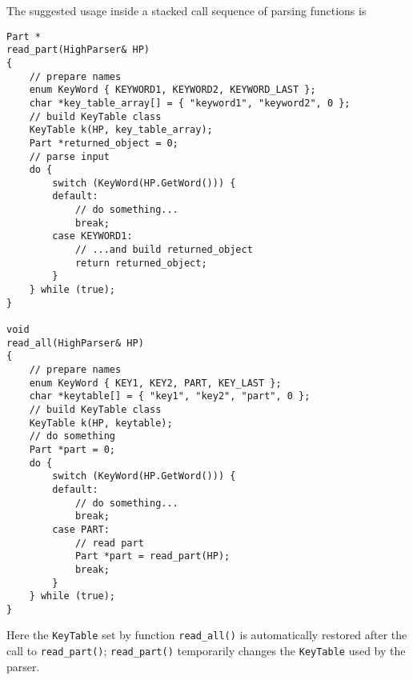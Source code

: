 \documentclass[10pt,dvips,fleqn,subeqn]{report}
\begin{document}
The suggested usage inside a stacked call sequence of parsing functions is
\begin{verbatim}
Part *
read_part(HighParser& HP)
{
    // prepare names
    enum KeyWord { KEYWORD1, KEYWORD2, KEYWORD_LAST };
    char *key_table_array[] = { "keyword1", "keyword2", 0 };
    // build KeyTable class
    KeyTable k(HP, key_table_array);
    Part *returned_object = 0;
    // parse input
    do {
        switch (KeyWord(HP.GetWord())) {
        default:
            // do something...
            break;
        case KEYWORD1:
            // ...and build returned_object
            return returned_object;
        }
    } while (true);
}

void
read_all(HighParser& HP)
{
    // prepare names
    enum KeyWord { KEY1, KEY2, PART, KEY_LAST };
    char *keytable[] = { "key1", "key2", "part", 0 };
    // build KeyTable class
    KeyTable k(HP, keytable);
    // do something
    Part *part = 0;
    do {
        switch (KeyWord(HP.GetWord())) {
        default:
            // do something...
            break;
        case PART:
            // read part
            Part *part = read_part(HP);
            break;
        }
    } while (true);
}

\end{verbatim}
Here the \texttt{KeyTable} set by function \texttt{read\_all()} 
is automatically restored after the call to \texttt{read\_part()}; 
\texttt{read\_part()} temporarily changes the \texttt{KeyTable}
used by the parser.
\end{document}
